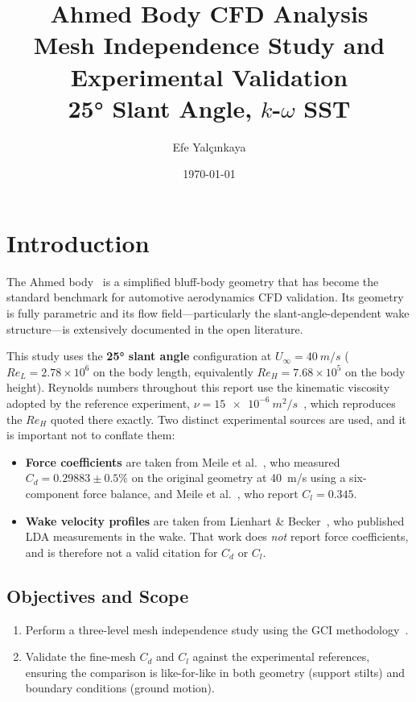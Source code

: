 \documentclass[12pt,a4paper]{article}
\title{\textbf{Ahmed Body CFD Analysis}\\[4pt]
\large Mesh Independence Study and Experimental Validation\\
25° Slant Angle, $k$-$\omega$ SST}
\author{Efe Yalçınkaya}
\date{\today}
\begin{document}
\maketitle
\tableofcontents
\newpage

\section{Introduction}

The Ahmed body~\cite{ahmed1984} is a simplified bluff-body geometry that has become the standard benchmark for automotive aerodynamics CFD validation. Its geometry is fully parametric and its flow field—particularly the slant-angle-dependent wake structure—is extensively documented in the open literature.

This study uses the \textbf{25° slant angle} configuration at $U_\infty = \SI{40}{m/s}$
($Re_L = 2.78\times10^6$ on the body length, equivalently $Re_H = 7.68\times10^5$ on the body
height). Reynolds numbers throughout this report use the kinematic viscosity adopted by the
reference experiment, $\nu = \SI{15e-6}{m^2/s}$~\cite{ercoftac082}, which reproduces the $Re_H$
quoted there exactly. Two distinct experimental sources are used, and it is important not to
conflate them:
\begin{itemize}
  \item \textbf{Force coefficients} are taken from Meile et al.~\cite{meile2016}, who measured
  $C_d = 0.29883 \pm 0.5\%$ on the original geometry at \SI{40}{m/s} using a six-component force
  balance, and Meile et al.~\cite{meile2011}, who report $C_l = 0.345$.
  \item \textbf{Wake velocity profiles} are taken from Lienhart \& Becker~\cite{lienhart2003}, who
  published LDA measurements in the wake. That work does \emph{not} report force coefficients, and
  is therefore not a valid citation for $C_d$ or $C_l$.
\end{itemize}

\subsection{Objectives and Scope}
\begin{enumerate}
  \item Perform a three-level mesh independence study using the GCI methodology~\cite{celik2008}.
  \item Validate the fine-mesh $C_d$ and $C_l$ against the experimental references, ensuring the
  comparison is like-for-like in both geometry (support stilts) and boundary conditions (ground
  motion).
\end{enumerate}
\end{document}
